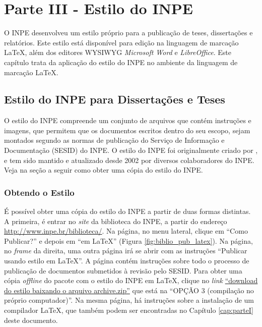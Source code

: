 \chapter{Parte III - Estilo do INPE}
\label{cap:parteIII}

O INPE desenvolveu um estilo próprio para a publicação de teses, dissertações e relatórios. Este estilo está disponível para edição na linguagem de marcação \LaTeX{}, além dos editores WYSIWYG \textit{Microsoft Word} e \textit{LibreOffice}. Este capítulo trata da aplicação do estilo do INPE no ambiente da linguagem de marcação \LaTeX{}.

\section{Estilo do INPE para Dissertações e Teses}

O estilo do INPE compreende um conjunto de arquivos que contém instruções e imagens, que permitem que os documentos escritos dentro do seu escopo, sejam montados segundo as normas de publicação do Serviço de Informação e Documentação (SESID) do INPE. O estilo do INPE foi originalmente criado por , e tem sido mantido e atualizado desde 2002 por diversos colaboradores do INPE. Veja na seção a seguir como obter uma cópia do estilo do INPE. %

\subsection*{Obtendo o Estilo}
\label{sec:obter}

É possível obter uma cópia do estilo do INPE a partir de duas formas distintas. A primeira, é entrar no \textit{site} da biblioteca do INPE, a partir do endereço \url{http://www.inpe.br/biblioteca/}. Na página, no menu lateral, clique em ``Como Publicar?'' e depois em ``em \LaTeX{}'' (Figura \ref{fig:biblio_pub_latex}). Na página, no \textit{frame} da direita, uma outra página irá se abrir com as instruções ``Publicar usando estilo em \LaTeX{}''. A página contém instruções sobre todo o processo de publicação de documentos submetidos à revisão pelo SESID. Para obter uma cópia \textit{offline} do pacote com o estilo do INPE em \LaTeX{}, clique no \textit{link} \href{http://mtc-m16c.sid.inpe.br/archive.cgi/sid.inpe.br/iris@1905/2005/08.25.14.01}{``download do estilo baixando o arquivo archive.zip''} que está na ``OPÇÃO 3 (compilação no próprio computador)''. Na mesma página, há instruções sobre a instalação de um compilador \LaTeX{}, que também podem ser encontradas no Capítulo \ref{cap:parteI} deste documento.

